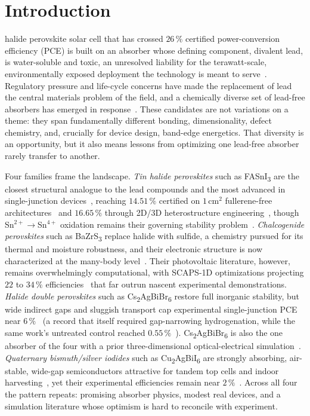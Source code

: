 \documentclass[lettersize,journal]{IEEEtran}
\newcommand{\FASnI}{FASnI\textsubscript{3}}
\newcommand{\CABI}{Cu\textsubscript{2}AgBiI\textsubscript{6}}
\newcommand{\BZS}{BaZrS\textsubscript{3}}
\newcommand{\CABB}{Cs\textsubscript{2}AgBiBr\textsubscript{6}}
\begin{document}
\section{Introduction}
 halide perovskite solar cell that has crossed
$26\,\%$ certified power-conversion efficiency (PCE) is built on an absorber
whose defining component, divalent lead, is water-soluble and toxic, an
unresolved liability for the terawatt-scale, environmentally exposed
deployment the technology is meant to serve~\cite{nrel_chart}. Regulatory
pressure and life-cycle concerns have made the replacement of lead the central
materials problem of the field, and a chemically diverse set of lead-free
absorbers has emerged in response~\cite{prakash2026}. These candidates are not
variations on a theme: they span fundamentally different bonding,
dimensionality, defect chemistry, and, crucially for device design, band-edge
energetics. That diversity is an opportunity, but it also means lessons from
optimizing one lead-free absorber rarely transfer to another.

Four families frame the landscape. \emph{Tin halide perovskites} such as
\FASnI{} are the closest structural analogue to the lead compounds and the
most advanced in single-junction devices~\cite{fasni3_14pct}, reaching
$14.51\,\%$ certified on $1\,\mathrm{cm}^2$ fullerene-free
architectures~\cite{li2026} and $16.65\,\%$ through 2D/3D heterostructure
engineering~\cite{he2025}, though Sn$^{2+}\!\rightarrow$Sn$^{4+}$ oxidation
remains their governing stability problem~\cite{yang2017}.
\emph{Chalcogenide perovskites} such as \BZS{} replace halide with sulfide, a
chemistry pursued for its thermal and moisture robustness, and their electronic
structure is now characterized at the many-body level~\cite{kumar2021}. Their
photovoltaic literature, however, remains overwhelmingly computational, with
SCAPS-1D optimizations projecting $22$ to $34\,\%$
efficiencies~\cite{sowayan2025,guo2025} that far outrun nascent experimental
demonstrations. \emph{Halide double perovskites} such as \CABB{} restore full
inorganic stability, but wide indirect gaps and sluggish transport cap
experimental single-junction PCE near
$6\,\%$~\cite{zhang2022,li2021review} (a record that itself required
gap-narrowing hydrogenation, while the same work's untreated control reached
$0.55\,\%$~\cite{zhang2022}). \CABB{} is also the one absorber of the four
with a prior three-dimensional optical-electrical simulation~\cite{moed2026}. \emph{Quaternary
bismuth/silver iodides} such as \CABI{} are strongly absorbing, air-stable,
wide-gap semiconductors attractive for tandem top cells and indoor
harvesting~\cite{sansom2021,moon2025}, yet their experimental efficiencies
remain near $2\,\%$~\cite{islam2023,pai2022}. Across all four the
pattern repeats: promising absorber physics, modest real devices, and a
simulation literature whose optimism is hard to reconcile with experiment.
\end{document}
